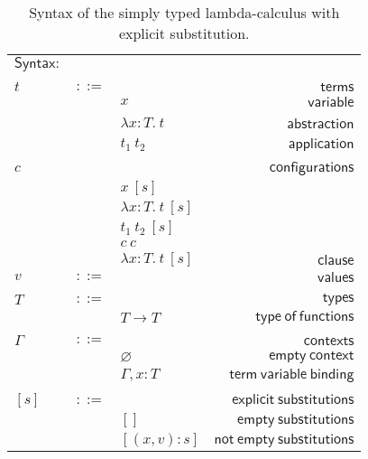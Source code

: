 \documentclass {article}
\newcommand{\app}[2]{#1 \ #2}
\newcommand{\abs}[3]{\lambda #1:#2. \ #3}
\newcommand{\conf}[2][s]{#2 \ [#1]}
\newcommand{\subxD}{[(x,v):s]}
\begin{document}
\begin{table}
\begin{center}
\begin{tabular}{|l c l r|}
\hline
$\mathsf {Syntax}:$&&&\\
&&&\\
$t$&$::=$&&$\mathsf {terms}$\\
&&$x$&$\mathsf {variable}$\\
&&$\abs {x}{T}{t}$&\ $\mathsf {abstraction}$\\
&&$\app {t_1}{t_2}$&$\mathsf {application}$\\
&&&\\
$c$&&&$\mathsf {configurations}$\\
&&$\conf {x}$&\\
&&$\conf {\abs {x}{T}{t}}$&\\
&&$\conf {\app {t_1}{t_2}}$&\\
&&$c \ c $&\\
&&$\conf {\abs {x}{T}{t}}$&$\mathsf {clause }$\\
$v$&$::=$&&$\mathsf {values}$\\
&&&\\
$T$&$::=$&&$\mathsf {types}$\\
&&$T \to T$&$\mathsf {type \ of \ functions}$\\
&&&\\
$\Gamma$&$::=$&&$\mathsf {contexts}$\\
&&$\varnothing$&$\mathsf {empty \ context}$\\
&&$\Gamma , x:T$&$\mathsf {term \ variable \ binding}$\\
&&&\\
$[s]$&$::=$&&$\mathsf {explicit \ substitutions}$\\
&&$[ ]$&$\mathsf {empty \ substitutions}$\\
&&$\subxD$&$\mathsf {not \ empty \ substitutions}$\\
\hline
\end{tabular}
\caption{Syntax of the simply typed lambda-calculus with explicit substitution.}
\label{tabla:sencilla}
\end{center}
\end{table}
\end{document}
